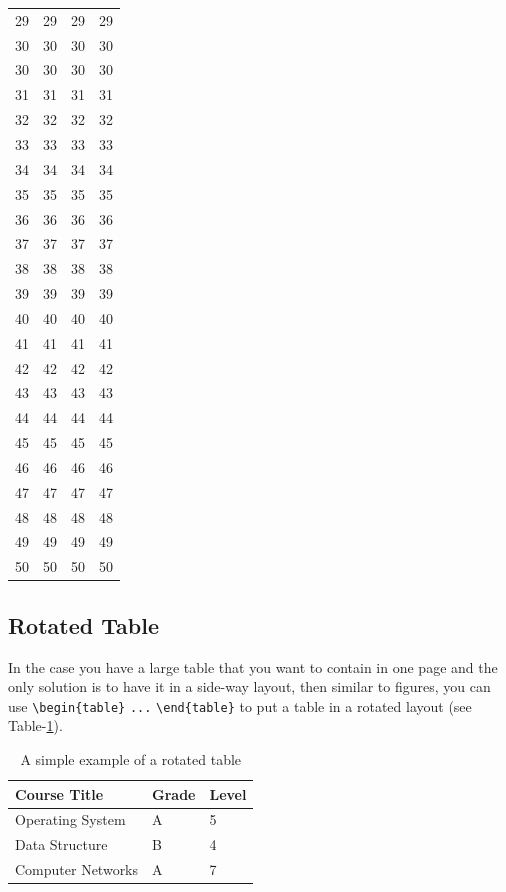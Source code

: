 \begin{longtable}{|c|c|c|c|}
    29 & 29 & 29 & 29 \\
    30 & 30 & 30 & 30 \\
    30 & 30 & 30 & 30 \\
    31 & 31 & 31 & 31 \\
    32 & 32 & 32 & 32 \\
    33 & 33 & 33 & 33 \\
    34 & 34 & 34 & 34 \\
    35 & 35 & 35 & 35 \\
    36 & 36 & 36 & 36 \\
    37 & 37 & 37 & 37 \\
    38 & 38 & 38 & 38 \\
    39 & 39 & 39 & 39 \\
    40 & 40 & 40 & 40 \\
    41 & 41 & 41 & 41 \\
    42 & 42 & 42 & 42 \\
    43 & 43 & 43 & 43 \\
    44 & 44 & 44 & 44 \\
    45 & 45 & 45 & 45 \\
    46 & 46 & 46 & 46 \\
    47 & 47 & 47 & 47 \\
    48 & 48 & 48 & 48 \\
    49 & 49 & 49 & 49 \\
    50 & 50 & 50 & 50 \\
\end{longtable}
\clearpage

\subsection{Rotated Table}

In the case you have a large table that you want to contain in one page and the only solution is to have it in a side-way layout, then similar to figures, you can use \verb|\begin{table}| \verb|...| \verb|\end{table}| to put a table in a rotated layout (see Table-\ref{tab:rotated-table}). 

\clearpage
\begin{table}
    \centering
    \begin{tabular}{lll}
        \hline\hline
        Course Title      & Grade & Level \\ \hline\hline
        Operating System  & A     & 5     \\
        Data Structure    & B     & 4     \\
        Computer Networks & A     & 7     \\ \hline
    \end{tabular}
    \caption{A simple example of a rotated table}
    \label{tab:rotated-table}
\end{table}
\clearpage


